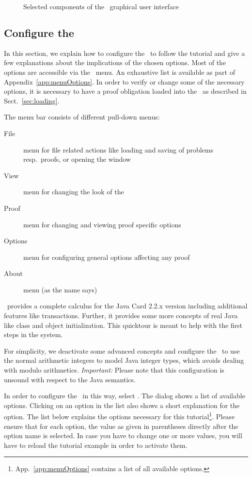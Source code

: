 \begin{figure}
  \caption{Selected components of the \kt\ graphical user interface}
  \label{fig:prover:components}
\end{figure}

\subsection{Configure the \kp}
\label{sec:configure}

In this section, we explain how to configure the \kp\ to follow the
tutorial and give a few explanations about the implications of the
chosen options. Most of the options are accessible via the \kp\
menu. An exhaustive list is available as part of
Appendix~\ref{app:menuOptions}. In order to verify or change some of
the necessary options, it is necessary to have a proof obligation
loaded into the \kp\ as described in Sect.~\ref{sec:loading}.

The menu bar consists of different pull-down menus:

\begin{description}
  \item[File] menu for file related actions like loading and saving
    of problems resp.\ proofs, or opening the \prm{} window
  \item[View] menu for changing the look of the \kp
  \item[Proof] menu for changing and viewing proof specific options
  \item[Options] menu for configuring general options affecting any proof
  \item[About] menu (as the name says)
\end{description}

\KeY\ provides a complete calculus for the Java Card 2.2.x version
including additional features like transactions. Further, it provides
some more concepts of real Java like class and object initialization.
This quicktour is meant to help with the first steps in the system.

For simplicity, we deactivate some advanced concepts and configure the \kp\ to
use the normal arithmetic integers to model Java integer types, which
avoids dealing with modulo arithmetics. \emph{Important:} Please
note that this configuration is unsound with respect to the Java
semantics.

In order to configure the \kp\ in this way, select
. The dialog shows a list of
available options. 
Clicking on an option in the list also shows a short explanation
for the option.
The list below explains the options necessary for
this tutorial\footnote{App.~\ref{app:menuOptions} contains a list of
  all available options.}. Please ensure that for each option, the
value as given in parentheses directly after the option name is
selected. In case you have to change one or more values, you will have
to reload the tutorial example in order to activate them.

